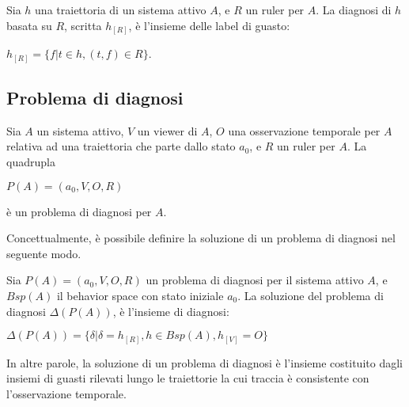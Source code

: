 \begin{defn}
Sia $h$ una traiettoria di un sistema attivo $A$, e $R$ un ruler per $A$. La diagnosi di $h$ basata su $R$, scritta $h_{[R]}$, è l'insieme delle label di guasto:
\begin{center}
	$h_{[R]} = \{ f | t \in h, (t,f) \in R \}$.
\end{center}
\end{defn}

\subsection{Problema di diagnosi}
\begin{defn}
Sia $A$ un sistema attivo, $V$ un viewer di $A$, $O$ una osservazione temporale per $A$ relativa ad una traiettoria che parte dallo stato $a_0$, e $R$ un ruler per $A$. La quadrupla
\begin{center}
	$P(A) = (a_0,V,O,R)$
\end{center}
è un problema di diagnosi per $A$.
\end{defn}
Concettualmente, è possibile definire la soluzione di un problema di diagnosi nel seguente modo.
\begin{defn}
Sia $P(A) = (a_0,V,O,R)$ un problema di diagnosi per il sistema attivo $A$, e $Bsp(A)$ il behavior space con stato iniziale $a_0$. La soluzione del problema di diagnosi $\Delta(P(A))$, è l'insieme di diagnosi:
\begin{center}
	$\Delta(P(A)) = \{ \delta | \delta = h_{[R]}, h \in Bsp(A), h_{[V]} = O\}$
\end{center}
\end{defn}
In altre parole, la soluzione di un problema di diagnosi è l'insieme costituito dagli insiemi di guasti rilevati lungo le traiettorie la cui traccia è consistente con l'osservazione temporale.

